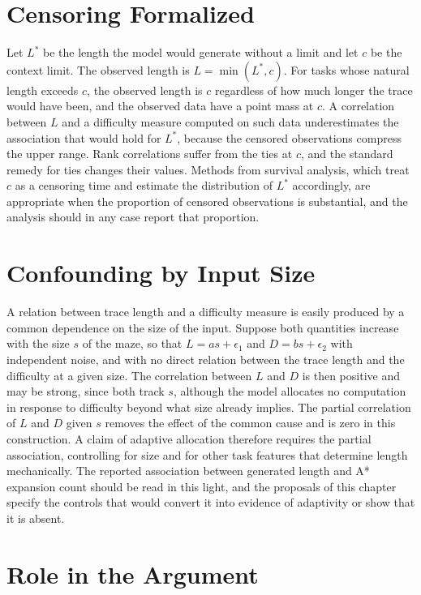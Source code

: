 \section{Censoring Formalized}

Let $L^\ast$ be the length the model would generate without a limit and let $c$ be the context limit. The observed length is $L=\min(L^\ast,c)$. For tasks whose natural length exceeds $c$, the observed length is $c$ regardless of how much longer the trace would have been, and the observed data have a point mass at $c$. A correlation between $L$ and a difficulty measure computed on such data underestimates the association that would hold for $L^\ast$, because the censored observations compress the upper range. Rank correlations suffer from the ties at $c$, and the standard remedy for ties changes their values. Methods from survival analysis, which treat $c$ as a censoring time and estimate the distribution of $L^\ast$ accordingly, are appropriate when the proportion of censored observations is substantial, and the analysis should in any case report that proportion.

\section{Confounding by Input Size}

A relation between trace length and a difficulty measure is easily produced by a common dependence on the size of the input. Suppose both quantities increase with the size $s$ of the maze, so that $L=as+\epsilon_1$ and $D=bs+\epsilon_2$ with independent noise, and with no direct relation between the trace length and the difficulty at a given size. The correlation between $L$ and $D$ is then positive and may be strong, since both track $s$, although the model allocates no computation in response to difficulty beyond what size already implies. The partial correlation of $L$ and $D$ given $s$ removes the effect of the common cause and is zero in this construction. A claim of adaptive allocation therefore requires the partial association, controlling for size and for other task features that determine length mechanically. The reported association between generated length and A* expansion count should be read in this light, and the proposals of this chapter specify the controls that would convert it into evidence of adaptivity or show that it is absent.

\section{Role in the Argument}

